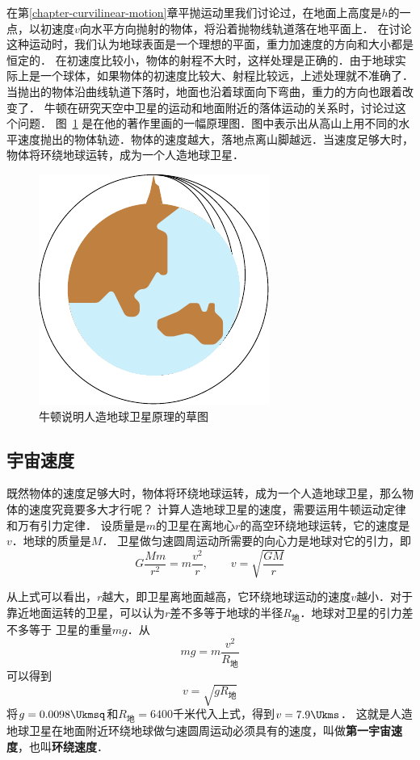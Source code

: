 在第\ref{chapter-curvilinear-motion}章平抛运动里我们讨论过，在地面上高度是$h$的一点，以初速度$v$向水平方向抛射的物体，将沿着抛物线轨道落在地平面上．
在讨论这种运动时，我们认为地球表面是一个理想的平面，重力加速度的方向和大小都是恒定的．
在初速度比较小，物体的射程不大时，这样处理是正确的．由于地球实际上是一个球体，如果物体的初速度比较大、射程比较远，上述处理就不准确了．
当抛出的物体沿曲线轨道下落时，地面也沿着球面向下弯曲，重力的方向也跟着改变了．
牛顿在研究天空中卫星的运动和地面附近的落体运动的关系时，讨论过这个问题．
图~\ref{fig_A_5-5} 是在他的著作里画的一幅原理图．图中表示出从高山上用不同的水平速度抛出的物体轨迹．物体的速度越大，落地点离山脚越远．当速度足够大时，物体将环绕地球运转，成为一个人造地球卫星．
\begin{figure}[htbp]
	\centering
	\includegraphics{fig/A/5-5.pdf}
	\caption{牛顿说明人造地球卫星原理的草图}\label{fig_A_5-5}
\end{figure}

\subsection{宇宙速度}

既然物体的速度足够大时，物体将环绕地球运转，成为一个人造地球卫星，那么物体的速度究竟要多大才行呢？
计算人造地球卫星的速度，需要运用牛顿运动定律和万有引力定律．
设质量是$m$的卫星在离地心$r$的高空环绕地球运转，它的速度是$v$．地球的质量是$M$．
卫星做匀速圆周运动所需要的向心力是地球对它的引力，即
\[G\frac{Mm}{r^2}=m\frac{v^2}{r},\qquad v=\sqrt{\frac{GM}{r}} \]

从上式可以看出，$r$越大，即卫星离地面越高，它环绕地球运动的速度$v$越小．对于靠近地面运转的卫星，可以认为$r$差不多等于地球的半径$R_{\text{地}}$．地球对卫星的引力差不多等于
卫星的重量$mg$．从
\[mg=m\frac{v^2}{R_{\text{地}}} \]
可以得到
\[v=\sqrt{gR_{\text{地}}}\]
将$g=0.0098 \Ukmsq$和$R_{\text{地}}=6400$千米代入上式，得到$v=7.9\Ukms$．
这就是人造地球卫星在地面附近环绕地球做匀速圆周运动必须具有的速度，叫做\textbf{第一宇宙速度}，也叫\textbf{环绕速度}．

